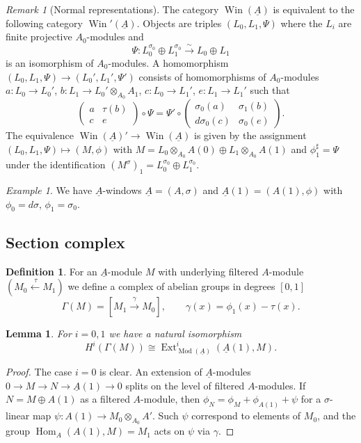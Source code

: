 \documentclass[a4paper,11pt]{amsart}
\theoremstyle{plain}
\newtheorem{Lemma}[equation]{Lemma}
\theoremstyle{definition}
\newtheorem{Defn}[equation]{Definition}
\theoremstyle{remark}
\newtheorem{Remark}[equation]{Remark}
\newtheorem{Example}[equation]{Example}
\newcommand{\bLe}{\begin{Lemma}}
\newcommand{\eLe}{\end{Lemma}}
\newcommand{\bDe}{\begin{Defn}}
\newcommand{\eDe}{\end{Defn}}
\newcommand{\bRe}{\begin{Remark}}
\newcommand{\eRe}{\end{Remark}}
\newcommand{\bEx}{\begin{Example}}
\newcommand{\eEx}{\end{Example}}
\newcommand{\bproof}{\begin{proof}}
\newcommand{\eproof}{\end{proof}}
\renewcommand{\u}{\underline}
\newcommand{\uM}{M} %
\newcommand{\uN}{N} %
\numberwithin{equation}{section}
\DeclareMathOperator{\Ext}{Ext}
\DeclareMathOperator{\Hom}{Hom}
\DeclareMathOperator{\Mod}{Mod}
\DeclareMathOperator{\Win}{Win}
\begin{document}
\bRe[Normal representations]
\label{Re:normal-repres}
The category $\Win(\u A)$ is equivalent to the following category $\Win'(\u A)$. Objects are triples $(L_0,L_1,\Psi)$ where the $L_i$ are finite projective $A_0$-modules and 
\[
\Psi\colon L_0^{\sigma_0}\oplus L_1^{\sigma_0}\xrightarrow\sim
L_0\oplus L_1
\]
is an isomorphism of $A_0$-modules. A homomorphism $(L_0,L_1,\Psi)\to(L_0',L_1',\Psi')$ consists of homomorphisms of $A_0$-modules $a\colon L_0\to L_0'$, $b\colon L_1\to L_0'\otimes_{A_0}A_1$, $c\colon L_0\to L_1'$, $e\colon L_1\to L_1'$ 
such that
\[
\left(\begin{matrix}a&\tau(b)\\c&e\end{matrix}\right)\circ\Psi
=
\Psi'\circ
\left(\begin{matrix}\sigma_0(a)&\sigma_1(b)\\d\sigma_0(c)&\sigma_0(e)\end{matrix}\right).
\]
The equivalence $\Win(\u A)'\to\Win(\u A)$ is given by the assignment $(L_0,L_1,\Psi)\mapsto(M,\phi)$ with $M=L_0\otimes_{A_0}A(0)\oplus L_1\otimes_{A_0}A(1)$ and $\phi_1^\sharp=\Psi$ under the identification $(M^\sigma)_1= L_0^{\sigma_0}\oplus L_1^{\sigma_0}$.
\eRe

\bEx
\label{Ex:win-uA-uA(1)}
We have $\u A$-windows $\u A=(A,\sigma)$ and $\u A(1)=(A(1),\phi)$ with $\phi_0=d\sigma$, $\phi_1=\sigma_0$.
\eEx

\subsection{Section complex}

\bDe
\label{De:Gamma(uM)}
For an $\u A$-module $\uM$ with underlying filtered $A$-module $(M_0\xleftarrow{\:\tau} M_1)$ we define a complex of abelian groups in degrees $[0,1]$
\[
\Gamma(\uM)=[M_1\xrightarrow{\;\gamma\;}M_0],
\qquad
\gamma(x)=\phi_1(x)-\tau(x).
\]
\eDe

\bLe
\label{Le:Hi-Gamma-uM}
For $i=0,1$ we have a natural isomorphism
\[
H^i(\Gamma(\uM))\cong\Ext^i_{\Mod(\u A)}(\u A(1),\uM).
\]
\eLe

\bproof
The case $i=0$ is clear. An extension of $\u A$-modules $0\to\uM\to\uN\to\u A(1)\to 0$ splits on the level of filtered $A$-modules. If $N=M\oplus A(1)$ as a filtered $A$-module, then $\phi_N=\phi_M+\phi_{A(1)}+\psi$ for a $\sigma$-linear map $\psi:A(1)\to M_0\otimes_{A_0}A'$. Such $\psi$ correspond to elements of $M_0$, and the group $\Hom_A(A(1),M)=M_1$ acts on $\psi$ via $\gamma$.
\eproof
\end{document}
